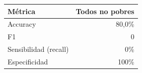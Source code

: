 
\begin{tabular}{lr}
\toprule
Métrica & Todos no pobres\\
\midrule
Accuracy & 80,0\%\\
F1 & 0\\
Sensibilidad (recall) & 0\%\\
Especificidad & 100\%\\
\bottomrule
\end{tabular}
